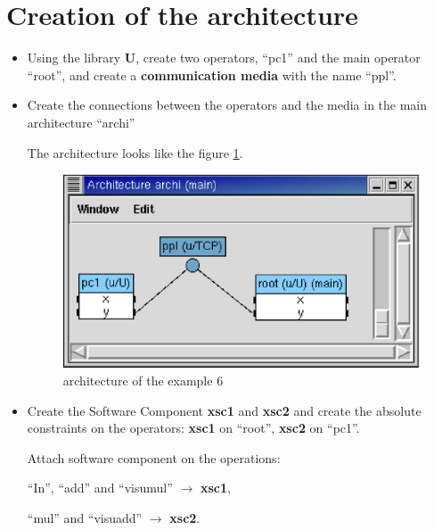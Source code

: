 \documentclass[a4paper,twoside]{report}
\begin{document}
\section{Creation of the architecture}
\begin{itemize}
\item Using the library \textbf{U}, create two operators, ``pc1'' and the main
operator ``root'', and create a \textbf{communication media} with the name
``ppl''.

\item Create the connections between the operators and the media in the main
architecture ``archi''

The architecture looks like the figure \ref{archi6}.

\begin{figure}[htbp]
  \begin{center} 
        \includegraphics[width=0.48\linewidth]{architecture_ex6.eps} 
  \end{center}
  \caption{architecture of the example 6}
  \label{archi6}
\end{figure}

\item Create the Software Component \textbf{xsc1} and \textbf{xsc2} and create
the absolute constraints on the operators: \textbf{xsc1} on ``root'',
\textbf{xsc2} on ``pc1''.

Attach software component on the operations: 

``In'', ``add'' and ``visumul'' $\rightarrow$ \textbf{xsc1},

``mul'' and ``visuadd'' $\rightarrow$ \textbf{xsc2}.

\end{itemize}
\end{document}
